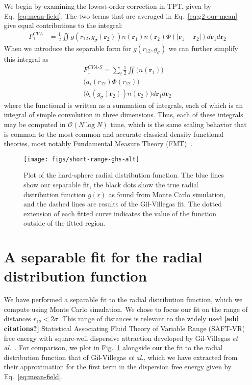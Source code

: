 \documentclass[letterpaper,twocolumn,amsmath,amssymb,pre,aps,10pt]{revtex4-1}
\newcommand{\red}[1]{{\bf \color{red} #1}}
\newcommand{\rr}{\textbf{r}}
\newcommand{\fixme}[1]{\red{[#1]}}
\begin{document}
We begin by examining the lowest-order correction in TPT, given by
Eq.~\ref{eq:mean-field}.  The two terms that are averaged in
Eq.~\ref{eq:g2-our-mean} give equal contributions to the integral:
\begin{align}
  F_1^{\textit{CVA}} &= \tfrac12 \!\! \iint \!\!
  g(r_{12},g_\sigma(\rr_2))n(\rr_1)n(\rr_2)\Phi(|\rr_1-\rr_2|)
  d\rr_1d\rr_2
\end{align}
When we introduce the separable form for $g(r_{12},g_\sigma)$ we can
further simplify this integral as
\begin{multline}
  F_1^{\textit{CVA-S}} =
  \sum_i \tfrac12 \!\! \iint \!\! \bigg( n(\rr_1)  \bigg) \\
                             \bigg( a_i(r_{12})\Phi(r_{12}) \bigg) \\
                             \bigg( b_i(g_\sigma(\rr_2))n(\rr_2) \bigg)
  d\rr_1d\rr_2
\end{multline}
where the functional is written as a summation of integrals, each of
which is an integral of simple convolution in three dimensions.  Thus,
each of these integrals may be computed in $\mathcal{O}(N\log N)$
time, which is the same scaling behavior that is common to the most
common and accurate classical density functional theories, most
notably Fundamental Measure Theory (FMT)~\cite{rosenfeld1989free,
  roth2002whitebear}.

\begin{figure}
  \centering
  \texttt{[image: figs/short-range-ghs-alt]}
  \caption{Plot of the hard-sphere radial distribution function. The
    blue lines show our separable fit, the black dots show the true
    radial distribution function $g(r)$ as found from Monte Carlo
    simulation, and the dashed lines are results of the
    Gil-Villegas\cite{gil1997statistical} fit.  The dotted extension
    of each fitted curve indicates the value of the function outside
    of the fitted region.  }\label{fig:radial-distribution}
\end{figure}

\section{A separable fit for the radial distribution function}\label{sec:separable-fit}

We have performed a separable fit to the radial distribution function,
which we compute using Monte Carlo simulation.  We chose to focus our
fit on the range of distances $r_{12} < 2\sigma$.  This range of
distances is relevant to the widely used \fixme{add citations?}
Statistical Associating Fluid Theory of Variable Range (SAFT-VR) free
energy with square-well dispersive attraction developed by
Gil-Villegas \emph{et al.}~\cite{gil1997statistical}.  For comparison,
we plot in Fig.~\ref{fig:radial-distribution} alongside our the fit to
the radial distribution function that of Gil-Villegas \emph{et al.},
which we have extracted from their approximation for the first term in
the dispersion free energy given by Eq.~\ref{eq:mean-field}.
\end{document}
